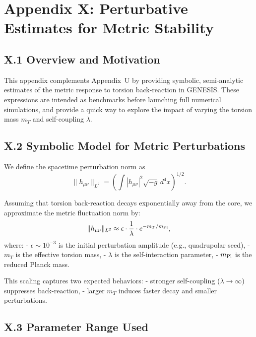 \documentclass{article}
\begin{document}
\section*{Appendix X: Perturbative Estimates for Metric Stability}
\label{app:perturb_stability}

\subsection*{X.1 Overview and Motivation}

This appendix complements Appendix~U by providing symbolic, semi-analytic estimates of the metric response to torsion back-reaction in GENESIS. These expressions are intended as benchmarks before launching full numerical simulations, and provide a quick way to explore the impact of varying the torsion mass $m_T$ and self-coupling $\lambda$.

\subsection*{X.2 Symbolic Model for Metric Perturbations}

We define the spacetime perturbation norm as
\begin{equation}
\|h_{\mu\nu}\|_{L^2} = \left( \int |h_{\mu\nu}|^2 \sqrt{-g} \, d^4x \right)^{1/2}.
\end{equation}

Assuming that torsion back-reaction decays exponentially away from the core, we approximate the metric fluctuation norm by:
\begin{equation}
\|h_{\mu\nu}\|_{L^2} \approx \epsilon \cdot \frac{1}{\lambda} \cdot e^{-m_T / m_{\rm Pl}},
\label{eq:metric-perturbation-scaling}
\end{equation}
where:
- $\epsilon \sim 10^{-3}$ is the initial perturbation amplitude (e.g., quadrupolar seed),
- $m_T$ is the effective torsion mass,
- $\lambda$ is the self-interaction parameter,
- $m_{\rm Pl}$ is the reduced Planck mass.

This scaling captures two expected behaviors:
- stronger self-coupling ($\lambda \to \infty$) suppresses back-reaction,
- larger $m_T$ induces faster decay and smaller perturbations.

\subsection*{X.3 Parameter Range Used}
\end{document}

